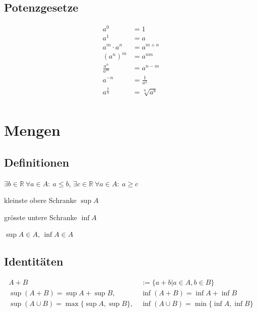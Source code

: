 \documentclass[11pt]{article}
\begin{document}
\subsection{Potenzgesetze}

\begin{equation*}
\begin{split}
	a^0 & = 1 \\
	a^1 & = a \\
	a^m \cdot a^n & = a^{m+n} \\
	(a^n)^m & = a^{nm} \\
	\frac{a^n}{a^m} & = a^{n-m} \\
	a^{-n} & = \frac{1}{a^n} \\
	a^{\frac{b}{n}} & = \sqrt[n]	{a^b} \\
\end{split}
\end{equation*}

\section{Mengen}

\subsection{Definitionen}

\begin{description}[labelindent=16pt,style=multiline,leftmargin=6cm, noitemsep]
	\item[Obere/Untere Schranke:] $\exists b \in \mathbb{R}\ \forall a\in A:\ a \leq b$, $\exists c \in \mathbb{R}\ \forall a\in A:\ a \geq c$
	\item[Supremum:] kleinste obere Schranke $\sup A$
	\item[Infimum:] gr{\"o}sste untere Schranke $\inf A$
	\item[Maximum/Minimum:] $\sup A \in A$, $\inf A \in A$
\end{description}

\subsection{Identitäten}

\begin{equation*}
\begin{split}
	A + B & := \{a + b | a \in A, b \in B\} \\
	\sup(A+B) = \sup A + \sup B,\ & \inf(A+B) = \inf A + \inf B \\
	\sup(A \cup B) = \max\{\sup A, \sup B\},\ & \inf(A \cup B) = \min\{\inf A, \inf B\}
\end{split}
\end{equation*}
\end{document}
